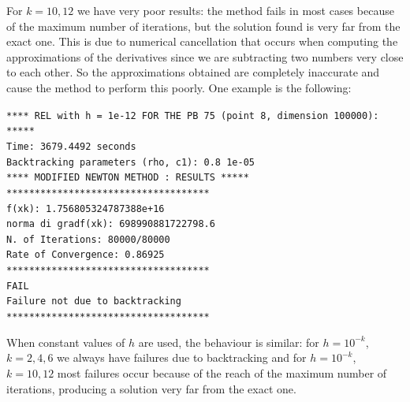 For $k=10, 12$ we have very poor results: the method fails in most cases because of the maximum number of iterations, but the solution found 
is very far from the exact one. This is due to numerical cancellation that occurs when computing the approximations of 
the derivatives since we are subtracting two numbers very close to each other. So the approximations obtained are completely inaccurate and cause
the method to perform this poorly. One example is the following:
\begin{list}{}{\setlength{\leftmargin}{0.7cm}}
    \item \texttt{**** REL with h = 1e-12 FOR THE PB 75 (point 8, dimension 100000):  ***** \\
    Time: 3679.4492 seconds\\
    Backtracking parameters (rho, c1): 0.8 1e-05\\
    **** MODIFIED NEWTON METHOD : RESULTS *****\\
    ************************************\\
    f(xk): 1.756805324787388e+16\\
    norma di gradf(xk): 698990881722798.6\\
    N. of Iterations: 80000/80000\\
    Rate of Convergence: 0.86925\\
    ************************************\\
    FAIL\\
    Failure not due to backtracking\\
    ************************************\\
    }
\end{list}

When constant values of $h$ are used, the behaviour is similar: for $h=10^{-k}$, $k=2,4,6$ we always have failures due to backtracking and 
for $h=10^{-k}$, $k=10,12$ most failures occur because of the reach of the maximum number of iterations, producing a solution very far from the exact one.

